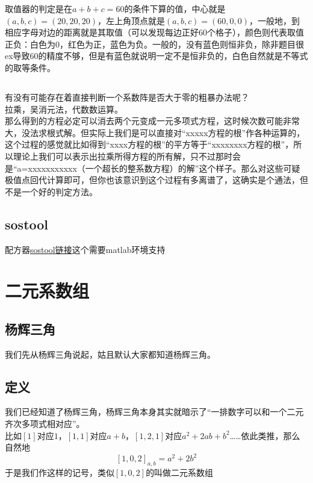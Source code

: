 \documentclass[UTF8]{ctexart}
\begin{document}
取值器的判定是在$ a+b+c=60 $的条件下算的值，中心就是$ (a,b,c)=(20,20,20) $，左上角顶点就是$ (a,b,c)=(60,0,0) $，一般地，到相应字母对边的距离就是其取值（可以发现每边正好60个格子），颜色则代表取值正负：白色为0，红色为正，蓝色为负。一般的，没有蓝色则恒非负，除非题目很ex导致60的精度不够，但是有蓝色就说明一定不是恒非负的，白色自然就是不等式的取等条件。
\subsection{}
有没有可能存在着直接判断一个系数阵是否大于零的粗暴办法呢？\\
拉乘，吴消元法，代数数运算。\\
那么得到的方程必定可以消去两个元变成一元多项式方程，这时候次数可能非常大，没法求根式解。但实际上我们是可以直接对“xxxxx方程的根”作各种运算的，这个过程的感觉就比如得到“xxxx方程的根”的平方等于“xxxxxxxx方程的根”，所以理论上我们可以表示出拉乘所得方程的所有解，只不过那时会是“a=xxxxxxxxxxx（一个超长的整系数方程）的解”这个样子。那么对这些可疑极值点回代计算即可，但你也该意识到这个过程有多离谱了，这确实是个通法，但不是一个好的判定方法。
\subsection{sostool}
配方器\href{https://www.mit.edu/~parrilo/sostools/}{sostool链接}这个需要matlab环境支持
\newpage
\section{二元系数组}
\subsection{杨辉三角}
我们先从杨辉三角说起，姑且默认大家都知道杨辉三角。
\subsection{定义}
我们已经知道了杨辉三角，杨辉三角本身其实就暗示了“一排数字可以和一个二元齐次多项式相对应”。\\
比如$ [1] $对应$ 1 $，$ [1,1] $对应$ a+b $，$ [1,2,1] $对应$ a^{2}+2ab+b^{2} $……依此类推，那么自然地
$$[1,0,2]_{a, b}=a^{2}+2 b^{2}$$
于是我们作这样的记号，类似$ [1,0,2] $的叫做二元系数组
\end{document}
